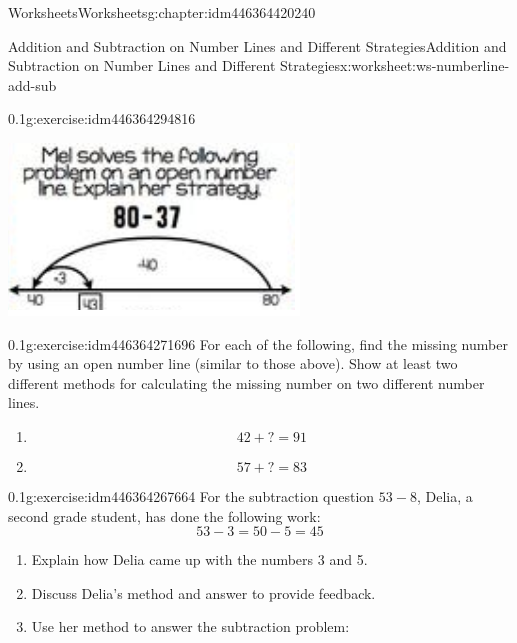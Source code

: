 \documentclass[twoside,11pt,]{book}
\begin{document}
\begin{chapterptx}{Worksheets}{}{Worksheets}{}{}{g:chapter:idm446364420240}
\begin{worksheet-section-numberless}{Addition and Subtraction on Number Lines and Different Strategies}{}{Addition and Subtraction on Number Lines and Different Strategies}{}{}{x:worksheet:ws-numberline-add-sub}
\begin{divisionexercise}{1}{}{0.1}{g:exercise:idm446364294816}
\begin{enumerate}[label=(\alph*)]
\begin{image}{0}{1}{0}
\includegraphics[width=1\linewidth]{images/numberline-add-sub-1b.png}
\end{image}%
\end{enumerate}
\end{divisionexercise}%
\begin{divisionexercise}{2}{}{0.1}{g:exercise:idm446364271696}%
For each of the following, find the missing number by using an open number line (similar to those above).  Show at least two different methods for calculating the missing number on two different number lines.%
%
\begin{enumerate}[label=(\alph*)]
\item{}%
\begin{equation*}
42+?=91 
\end{equation*}
%
\item{}%
\begin{equation*}
57+?=83 
\end{equation*}
%
\end{enumerate}
\end{divisionexercise}%
\begin{divisionexercise}{3}{}{0.1}{g:exercise:idm446364267664}%
For the subtraction question \(53-8\), Delia, a second grade student, has done the following work:%
\begin{equation*}
53- 3=50-5=45
\end{equation*}
%
%
\begin{enumerate}[label=(\alph*)]
\item{}Explain how Delia came up with the numbers 3 and 5.%
\item{}Discuss Delia's method and answer to provide feedback.%
\item{}Use her method to answer the subtraction problem:%
\begin{equation*}

\end{equation*}
\end{enumerate}
\end{divisionexercise}
\end{worksheet-section-numberless}
\end{chapterptx}
\end{document}
